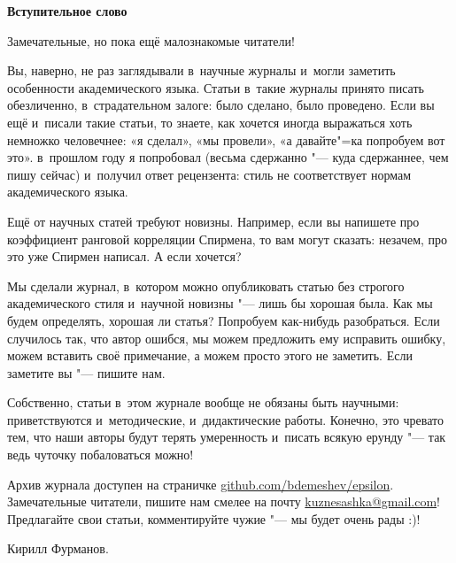 \documentclass[11pt]{article}
\begin{document}
\pagestyle{empty}

\begin{center}
\Large\textbf{Вступительное слово}
\end{center}


Замечательные, но пока ещё малознакомые читатели!

Вы, наверно, не раз заглядывали в~научные журналы и~могли заметить особенности академического языка. Статьи в~такие журналы принято писать обезличенно, в~страдательном залоге: было сделано, было проведено. Если вы ещё и~писали такие статьи, то знаете, как хочется иногда выражаться хоть немножко человечнее: «я сделал», «мы провели», «а давайте"=ка попробуем вот это». в~прошлом году я попробовал (весьма сдержанно "--- куда сдержаннее, чем пишу сейчас) и~получил ответ рецензента: стиль не соответствует нормам академического языка.

Ещё от научных статей требуют новизны. Например, если вы напишете про коэффициент ранговой корреляции Спирмена, то вам могут сказать: незачем, про это уже Спирмен написал. А если хочется?

Мы сделали журнал, в~котором можно опубликовать статью без строгого академического стиля и~научной новизны "--- лишь бы хорошая была. Как мы будем определять, хорошая ли статья? Попробуем как-нибудь разобраться. Если случилось так, что автор ошибся, мы можем предложить ему исправить ошибку, можем вставить своё примечание, а можем просто этого не заметить. Если заметите вы "--- пишите нам.

Собственно, статьи в~этом журнале вообще не обязаны быть научными: приветствуются и~методические, и~дидактические работы. Конечно, это чревато тем, что наши авторы будут терять умеренность и~писать всякую ерунду "--- так ведь чуточку побаловаться можно!

Архив журнала доступен на страничке \href{http://bdemeshev.github.io/epsilon/}{github.com/bdemeshev/epsilon}. Замечательные читатели, пишите нам смелее на почту \href{mailto:kuznesashka@gmail.com}{kuznesashka@gmail.com}! Предлагайте свои статьи, комментируйте чужие "--- мы будет очень рады :)!


\begin{flushright}
Кирилл Фурманов.
\end{flushright}
\end{document}

